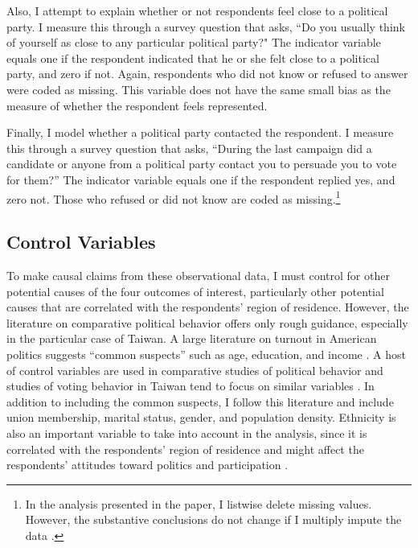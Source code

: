 \documentclass[12pt]{article}
\begin{document}
Also, I attempt to explain whether or not respondents feel close to a political party. I measure this through a survey question that asks, ``Do you usually think of yourself as close to any particular political party?" The indicator variable equals one if the respondent indicated that he or she felt close to a political party, and zero if not. Again, respondents who did not know or refused to answer were coded as missing. This variable does not have the same small bias as the measure of whether the respondent feels represented.

Finally, I model whether a political party contacted the respondent. I measure this through a survey question that asks, ``During the last campaign did a candidate or anyone from a political party contact you to persuade you to vote for them?'' The indicator variable equals one if the respondent replied yes, and zero not. Those who refused or did not know are coded as missing.\footnote{In the analysis presented in the paper, I listwise delete missing values. However, the substantive conclusions do not change if I multiply impute the data \citep{HonakerKingBlackwell2011, Kingetal2001}.}

\subsection*{Control Variables}

To make causal claims from these observational data, I must control for other potential causes of the four outcomes of interest, particularly other potential causes that are correlated with the respondents' region of residence. However, the literature on comparative political behavior offers only rough guidance, especially in the particular case of Taiwan. A large literature on turnout in American politics suggests ``common suspects'' such as age, education, and income \citep{Campbelletal1960, RosenstoneHansen1993}. A host of control variables are used in comparative studies of political behavior \citep[e.g.][]{KarpBanducci2008, Blais2000} and studies of voting behavior in Taiwan tend to focus on similar variables \citep{HoWengClarke2015, Hoetal2013}. In addition to including the common suspects, I follow this literature and include union membership, marital status, gender, and population density. Ethnicity is also an important variable to take into account in the analysis, since it is correlated with the respondents' region of residence and might affect the respondents' attitudes toward politics and participation \citep{Hsieh2005, ChangWang2005, Chu2004}.
\end{document}
